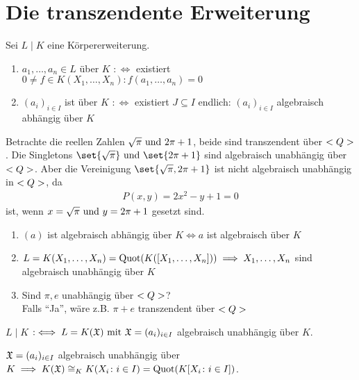 \section{Die transzendente Erweiterung}
Sei $L\mid K$ eine Körpererweiterung.
\begin{definition}
	\begin{enumerate}[label=(\alph*)]
		\item $a_1, \dots, a_n \in L$  über $K$ $: \iff $ existiert \\$0 \neq f \in K(X_1,\dots, X_n) \colon f(a_1, \dots, a_n) = 0$
		\item $(a_i)_{i\in I}$ ist  über $K$ $:\iff$ existiert $J \subseteq I$ endlich: $(a_i)_{i\in I}$ algebraisch abhängig über $K$
	\end{enumerate}
\end{definition}
\begin{*example}
	Betrachte die reellen Zahlen $\sqrt{\pi} \text{ und } 2\pi +1$, beide sind transzendent über $<Q>$. Die Singletons $\set{\sqrt{\pi}}\und \set{2\pi +1}$ sind algebraisch unabhängig über $<Q>$. Aber die Vereinigung $\set{\sqrt{\pi}, 2\pi +1}$ ist nicht algebraisch unabhängig in $<Q>$, da
	\begin{align*}
		P(x,y) = 2x^2 - y + 1 = 0
	\end{align*}
	ist, wenn $x = \sqrt{\pi} \text{ und } y = 2\pi +1$ gesetzt sind.
\end{*example}
\begin{remark}
	\begin{enumerate}[label=(\alph*)]
		\item $(a)$ ist algebraisch abhängig über $K \iff a$ ist algebraisch über $K$
		\item $L = K(X_1,\dots, X_n) = \operatorname{Quot}(K([X_1,\dots, X_n])) \implies X_1,\dots, X_n$ sind algebraisch unabhängig über $K$
		\item Sind $\pi, e$ unabhängig über $<Q>$?\\
		Falls ``Ja'', wäre z.B. $\pi+e$ transzendent über $<Q>$
	\end{enumerate}
\end{remark}
\begin{definition}
	$L \mid K$  $:\iff L = K(\mathfrak{X}) \text{ mit } \mathfrak{X} = (a_i)_{i\in I}$ algebraisch unabhängig über $K$.
\end{definition}
\begin{lemma}
	$\mathfrak{X} = (a_i)_{i \in I}$ algebraisch unabhängig über $K \implies K(\mathfrak{X}) \cong_K K(X_i \colon i \in I) = \operatorname{Quot}(K[X_i \colon i \in I])$. 
\end{lemma}
